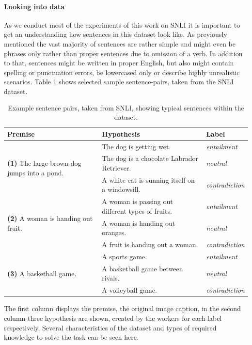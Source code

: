 \paragraph*{Looking into data}
As we conduct most of the experiments of this work on \ac{SNLI} it is important to get an understanding how sentences in this dataset look like. As previously mentioned the vast majority of sentences are rather simple and might even be phrases only rather than proper sentences due to omission of a verb. In addition to that, sentences might be written in proper English, but also might contain spelling or punctuation errors, be lowercased only or describe highly unrealistic scenarios.  Table \ref{table:snli_example} shows selected sample sentence-pairs, taken from the \ac{SNLI} dataset.
\begin{center}
\begin{table}[htt]
\begin{center}
\begin{tabular}{lll}
\textbf{Premise} & \textbf{Hypothesis} & \textbf{Label} \\
\toprule
\multirow{3}{*}{\textbf{(1)} The large brown dog jumps into a pond.} & The dog is getting wet. & \textit{entailment} \\ & The dog is a chocolate Labrador Retriever. & \textit{neutral} \\
&A white cat is sunning itself on a windowsill. & \textit{contradiction} \\
\midrule
\multirow{3}{*}{\textbf{(2)} A woman is handing out fruit.} & A woman is passing out different types of fruits. & \textit{entailment} \\
&A woman is handing out oranges. & \textit{neutral} \\
&A fruit is handing out a woman. & \textit{contradiction} \\
\midrule
\multirow{3}{*}{\textbf{(3)} A basketball game.} & A sports game. & \textit{entailment} \\
&A basketball game between rivals. & \textit{neutral} \\
&A volleyball game. & \textit{contradiction} \\
\bottomrule
\end{tabular}
\end{center}
\caption{Example sentence pairs, taken from \ac{SNLI}, showing typical sentences within the dataset.}
\label{table:snli_example}
\end{table}
\end{center}
The first column displays the premise, the original image caption, in the second column three hypothesis are shown, created by the workers for each label respectively. Several characteristics of the dataset and types of required knowledge to solve the task can be seen here. 
